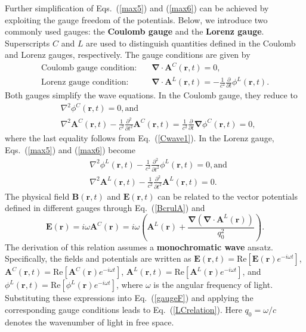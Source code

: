 Further simplification of Eqs.~(\ref{max5}) and (\ref{max6}) can be achieved by exploiting the gauge freedom of the potentials. Below, we introduce two commonly used gauges: the \textbf{Coulomb gauge} and the \textbf{Lorenz gauge}. Superscripts $C$ and $L$ are used to distinguish quantities defined in the Coulomb and Lorenz gauges, respectively. The gauge conditions are given by
\begin{align} 
\text{Coulomb gauge condition}: \quad &\boldsymbol{\nabla}\cdot\boldsymbol{A}^C(\boldsymbol{r}, t)=0,  \label{Ccondition}\\
\text{Lorenz gauge condition}: \quad &\boldsymbol{\nabla}\cdot\boldsymbol{A}^L(\boldsymbol{r}, t)=-\frac{1}{c^2}\frac{\partial }{\partial t}\phi^L(\boldsymbol{r}, t).
\end{align}
Both gauges simplify the wave equations. In the Coulomb gauge, they reduce to
\begin{align} 
&\nabla^2\phi^C(\boldsymbol{r}, t)=0, \text{and} \label{Cwave1}\\
&\nabla^2\boldsymbol{A}^C(\boldsymbol{r}, t)-\frac{1}{c^2}\frac{\partial^2 }{\partial t^2}\boldsymbol{A}^C(\boldsymbol{r}, t)=\frac{1}{c^2}\frac{\partial }{\partial t}\boldsymbol{\nabla}\phi^C(\boldsymbol{r}, t)=0, \label{Cwave2}
\end{align}
where the last equality follows from Eq.~(\ref{Cwave1}).
In the Lorenz gauge, Eqs.~(\ref{max5}) and (\ref{max6}) become
\begin{align} 
&\nabla^2\phi^L(\boldsymbol{r}, t)-\frac{1}{c^2}\frac{\partial^2 }{\partial t^2}\phi^L(\boldsymbol{r}, t)=0, \text{and} \label{Lwave1}\\
&\nabla^2\boldsymbol{A}^L(\boldsymbol{r}, t)-\frac{1}{c^2}\frac{\partial^2 }{\partial t^2}\boldsymbol{A}^L(\boldsymbol{r}, t)=0. \label{Lwave2}
\end{align}
The physical field $\boldsymbol{B}(\boldsymbol{r}, t)$ and $\boldsymbol{E}(\boldsymbol{r}, t)$ can be related to the vector potentials defined in different gauges through Eq.~(\ref{BcrulA}) and
\begin{equation} 
\boldsymbol{E}(\boldsymbol{r})=i\omega\boldsymbol{A}^C(\boldsymbol{r})=
i\omega\left(\boldsymbol{A}^L(\boldsymbol{r})+
\frac{\boldsymbol{\nabla}\left(\boldsymbol{\nabla}\cdot\boldsymbol{A}^L(\boldsymbol{r})\right)}{q_0^2}\right).
\label{LCrelation}
\end{equation}
The derivation of this relation assumes a \textbf{monochromatic wave} ansatz. Specifically, the fields and potentials are written as
$\boldsymbol{E}(\boldsymbol{r}, t)=\mathrm{Re}\left[\boldsymbol{E}(\boldsymbol{r}) e^{-i\omega t}\right]$,
$\boldsymbol{A}^C(\boldsymbol{r}, t)=\mathrm{Re}\left[\boldsymbol{A}^C(\boldsymbol{r}) e^{-i\omega t}\right]$,
$\boldsymbol{A}^L(\boldsymbol{r}, t)=\mathrm{Re}\left[\boldsymbol{A}^L(\boldsymbol{r}) e^{-i\omega t}\right]$, and
$\phi^L(\boldsymbol{r}, t)=\mathrm{Re}\left[\phi^L(\boldsymbol{r}) e^{-i\omega t}\right]$,
where $\omega$ is the angular frequency of light. Substituting these expressions into Eq.~(\ref{gaugeF}) and applying the corresponding gauge conditions leads to Eq.~(\ref{LCrelation}). Here $q_0=\omega/c$ denotes the wavenumber of light in free space.
%
%
%
%
%
%
